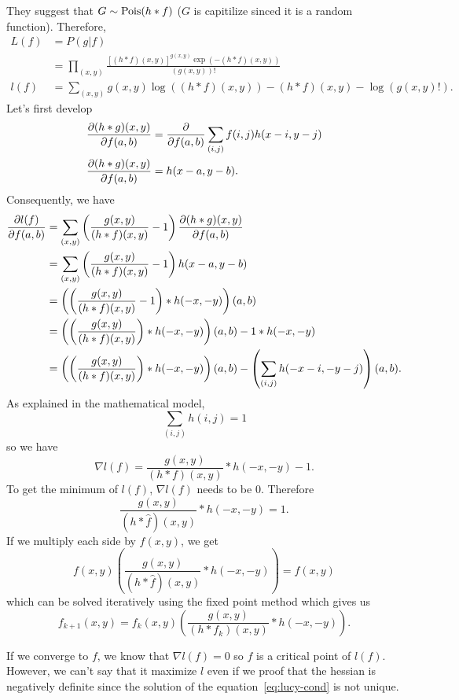 They suggest that $G \sim \operatorname{Pois}(h * f)$ ($G$ is capitilize sinced it is a random function).
Therefore,
\begin{align*}
  L(f) & = P(g|f)\\
  & = \prod_{(x,y)} \frac{[(h*f)(x,y)]^{g(x,y)} \exp(-(h*f)(x,y))}{(g(x,y))!}\\
  l(f) & = \sum_{(x,y)} g(x,y)\log((h*f)(x,y)) - (h*f)(x,y) -\log(g(x,y)!).
\end{align*}
Let's first develop
\begin{align*}
  \frac{\partial (h*g)(x,y)}{\partial f(a,b)} & = \frac{\partial }{\partial f(a,b)}\sum_{(i,j)}f(i,j)h(x-i,y-j)\\
  \frac{\partial (h*g)(x,y)}{\partial f(a,b)} & = h(x-a,y-b).
\end{align*}
Consequently, we have
\begin{align*}
  \frac{\partial l(f)}{\partial f(a,b)} & = \sum_{(x,y)} \left(\frac{g(x,y)}{(h*f)(x,y)} - 1\right) \frac{\partial (h*g)(x,y)}{\partial f(a,b)}\\
  & = \sum_{(x,y)} \left(\frac{g(x,y)}{(h*f)(x,y)} - 1\right) h(x-a,y-b)\\
  & = \left(\left(\frac{g(x,y)}{(h*f)(x,y)} - 1\right) * h(-x,-y)\right)(a,b)\\
  & = \left(\left(\frac{g(x,y)}{(h*f)(x,y)}\right) * h(-x,-y)\right)(a,b) - 1 * h(-x,-y)\\
  & = \left(\left(\frac{g(x,y)}{(h*f)(x,y)}\right) * h(-x,-y)\right)(a,b) - \left(\sum_{(i,j)} h(-x-i,-y-j)\right)(a,b).
\end{align*}
As explained in the mathematical model,
\[ \sum_{(i,j)} h(i,j) = 1 \]
so we have
\[ \nabla l(f) = \frac{g(x,y)}{(h*f)(x,y)} * h(-x,-y) - 1. \]
To get the minimum of $l(f)$, $\nabla l(f)$ needs to be 0.
Therefore
\begin{equation}
  \label{eq:lucy-cond}
  \frac{g(x,y)}{(h*\hat{f})(x,y)} * h(-x,-y) = 1.
\end{equation}
If we multiply each side by $f(x,y)$, we get
\[ f(x,y)\left(\frac{g(x,y)}{(h*\hat{f})(x,y)} * h(-x,-y)\right) = f(x,y) \]
which can be solved iteratively using the fixed point method which gives us
\[ f_{k+1}(x,y) = f_k(x,y)\left(\frac{g(x,y)}{(h*f_k)(x,y)} * h(-x,-y)\right). \]

If we converge to $f$, we know that $\nabla l(f) = 0$
so $f$ is a critical point of $l(f)$.
However, we can't say that it maximize $l$ even
if we proof that the hessian is negatively definite since
the solution of the equation~\eqref{eq:lucy-cond}
is not unique.

